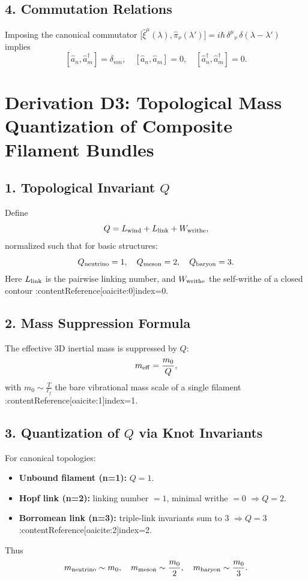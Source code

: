 \subsection*{4. Commutation Relations}
Imposing the canonical commutator
\(\bigl[\hat{\xi}^\mu(\lambda),\hat{\pi}_\nu(\lambda')\bigr]
= i\hbar\,\delta^\mu{}_\nu\,\delta(\lambda-\lambda')\)
implies
\[
[\hat{a}_n,\hat{a}_m^\dagger] = \delta_{nm},\quad
[\hat{a}_n,\hat{a}_m] = 0,\quad
[\hat{a}_n^\dagger,\hat{a}_m^\dagger] = 0.
\]
\section*{Derivation D3: Topological Mass Quantization of Composite Filament Bundles}
\subsection*{1. Topological Invariant \(Q\)}
Define
\[
Q = L_{\rm wind} + L_{\rm link} + W_{\rm writhe},
\]
normalized such that for basic structures:
\[
Q_{\rm neutrino}=1,\quad
Q_{\rm meson}=2,\quad
Q_{\rm baryon}=3.
\]
Here \(L_{\rm link}\) is the pairwise linking number, and \(W_{\rm writhe}\) the self-writhe of a closed contour :contentReference[oaicite:0]{index=0}.

\subsection*{2. Mass Suppression Formula}
The effective 3D inertial mass is suppressed by \(Q\):
\[
m_{\rm eff} = \frac{m_0}{Q},
\]
with \(m_0 \sim \frac{T}{\ell_f}\) the bare vibrational mass scale of a single filament :contentReference[oaicite:1]{index=1}.

\subsection*{3. Quantization of \(Q\) via Knot Invariants}
For canonical topologies:
\begin{itemize}
  \item \textbf{Unbound filament (n=1):} \(Q=1\).
  \item \textbf{Hopf link (n=2):} linking number \(=1\), minimal writhe \(=0\) \(\Rightarrow Q=2\).
  \item \textbf{Borromean link (n=3):} triple-link invariants sum to 3 \(\Rightarrow Q=3\) :contentReference[oaicite:2]{index=2}.
\end{itemize}
Thus
\[
m_{\rm neutrino}\sim m_0,\quad
m_{\rm meson}\sim \frac{m_0}{2},\quad
m_{\rm baryon}\sim \frac{m_0}{3}.
\]

